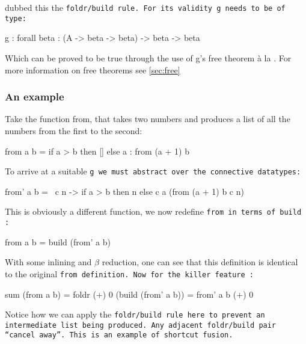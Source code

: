 \cite{Gill1993} dubbed this the \tt{foldr/build} rule. For its validity \tt{g} needs to be of type:
\begin{code}
    g : forall beta : (A -> beta -> beta) -> beta -> beta
\end{code}
Which can be proved to be true through the use of g's free theorem \`a la \cite{Wadler1989}. For more information on free theorems see \autoref{sec:free}

\subsubsection{An example}
Take the function from, that takes two numbers and produces a list of all the numbers from the first to the second:
\begin{code}
    from a b = if a > b
               then []
               else a : from (a + 1) b
\end{code}
To arrive at a suitable \tt{g} we must abstract over the connective datatypes:
\begin{code}
    from' a b = \ c n  -> if a > b
                          then n
                          else c a (from (a + 1) b c n)
\end{code}
This is obviously a different function, we now redefine \tt{from} in terms of \tt{build} \citep{Gill1993}:
\begin{code}
    from a b = build (from' a b)
\end{code}
With some inlining and $\beta$ reduction, one can see that this definition is identical to the original \tt{from} definition. Now for the killer feature \citep{Gill1993}:
\begin{code}
    sum (from a b)
      = foldr (+) 0 (build (from' a b))
      = from' a b (+) 0
\end{code}
Notice how we can apply the \tt{foldr/build} rule here to prevent an intermediate list being produced. Any adjacent \tt{foldr/build} pair ``cancel away''.
This is an example of shortcut fusion.

